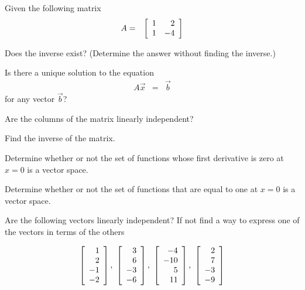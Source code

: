   \begin{problem}
  \item Given the following matrix
    \begin{eqnarray*}
      A & = & \left[ \begin{array}{rr} 1 & 2 \\ 1 & -4 \end{array} \right]
    \end{eqnarray*}
    \begin{subproblem}
      \item Does the inverse exist? (Determine the answer without
        finding the inverse.)
        \vfill
      \item Is there a unique solution to the equation
        \begin{eqnarray*}
          A \vec{x} & = & \vec{b}
        \end{eqnarray*}
        for any vector $\vec{b}$?
        \vfill
      \item Are the columns of the matrix linearly independent?
        \vfill
    \end{subproblem}

    \clearpage
  \item Find the inverse of the matrix.

        \vfill
        
  \end{problem}


  \begin{problem}

    \item Determine whether or not the set of functions whose first
      derivative is zero at $x=0$ is a vector space.
      \vfill

    \item Determine whether or not the set of functions that are equal
      to one at $x=0$ is a vector space.
      \vfill

      \clearpage

  \item Are the following vectors linearly independent? If not find a
    way to express one of the vectors in terms of the others

    \begin{eqnarray*}
      \left[ \begin{array}{r} 1 \\ 2 \\ -1 \\ -2 \end{array} \right],~\left[ \begin{array}{r} 3 \\ 6 \\ -3 \\ -6 \end{array} \right],~\left[ \begin{array}{r} -4 \\ -10 \\ 5 \\ 11 \end{array} \right],
      ~\left[ \begin{array}{r} 2 \\ 7 \\ -3 \\ -9 \end{array} \right]
    \end{eqnarray*}


\end{problem}
